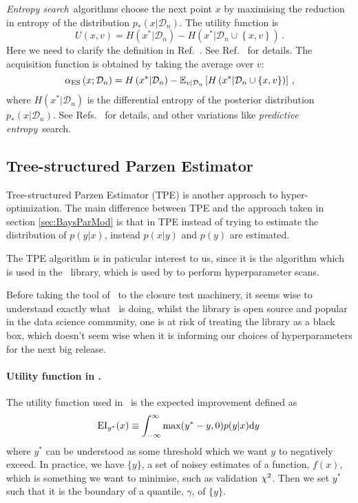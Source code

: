 {\em Entropy search}\ algorithms choose the next point $x$ by maximising the
reduction in entropy of the distribution $p_*(x|\mathcal{D}_n)$. The utility
function is 
\begin{equation}
    \label{eq:ESUtil}
    U(x,v) = H\left(x^*|\mathcal{D}_n\right) - 
    H\left(x^*|\mathcal{D}_n \cup \left\{x,v\right\}\right)\, .
\end{equation}
Here we need to clarify the definition in Ref.~\cite{shahriari2015taking}. See
Ref.~\cite{hernandez2014predictive} for details. The acquisition function is
obtained by taking the average over $v$: 
\begin{equation}
    \label{eq:ESAcq}
    \alpha_\mathrm{ES}\left(x;\mathcal{D}_n\right) = 
    H\left(x^*|\mathcal{D}_n\right) - 
    \mathbb{E}_{v|\mathcal{D}_n}\left[H\left(x^*|\mathcal{D}_n \cup \left\{x,v\right\}\right)\right]\, ,
\end{equation}
where $H\left(x^*|\mathcal{D}_n\right)$ is the differential entropy of the
posterior distribution $p_*(x|\mathcal{D}_n)$. See
Refs.~\cite{hennig2012entropy,villemonteix2009informational} for details, and
other variations like {\em predictive entropy}\ search.

\subsection{Tree-structured Parzen Estimator}

Tree-structured Parzen Estimator (TPE) is another approach to hyper-optimization.
The main difference between TPE and the approach taken in section \ref{sec:BaysParMod}
is that in TPE instead of trying to estimate the distribution of $p(y|x)$, instead
$p(x|y)$ and $p(y)$ are estimated.

The TPE algorithm is in paticular interest to us, since it is the algorithm which
is used in the \hyperopt\ library, which is used by \nfit to perform hyperparameter
scans.

Before taking the tool of \hyperopt\ to the closure test machinery, it seems wise
to understand exactly what \hyperopt\ is doing, whilst the library is open source
and popular in the data science community, one is at risk of treating the library
as a black box, which doesn't seem wise when it is informing our choices of hyperparameters
for the next big release.

\paragraph[]{Utility function in \hyperopt.} The utility function used in \hyperopt\
is the expected improvement defined as
\begin{equation}
    \label{eq:expectedimp}
    \mathrm{EI}_{y^{*}}(x) \equiv \int_{- \infty}^{\infty} \max(y^{*} - y, 0)p(y|x) {\rm d} y \,
\end{equation}
where $y^{*}$ can be understood as some threshold which we want $y$ to negatively exceed.
In practice, we have $\{y\}$, a set of noisey estimates of a function, $f(x)$, which
is something we want to minimise, such as validation $\chi^{2}$. Then we set $y^*$
such that it is the boundary of a quantile, $\gamma$, of $\{y\}$.

